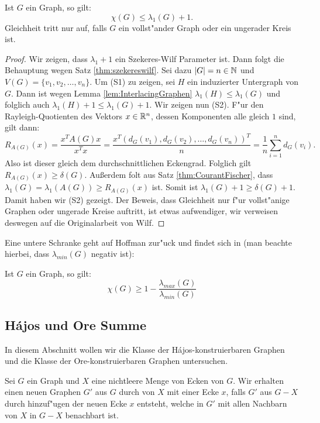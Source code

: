   \begin{theorem}
    Ist $G$ ein Graph, so gilt: 
    $$\chi(G) \leq \lambda_{1}(G) +1.$$
    Gleichheit tritt nur auf, falls $G$ ein vollst"ander Graph oder ein ungerader Kreis ist.
    \label{thm:wilfev}
  \end{theorem}

  \begin{proof}
    Wir zeigen, dass $\lambda_{1}+1$ ein Szekeres-Wilf Parameter ist. Dann folgt die Behauptung wegen Satz \ref{thm:szekereswilf}. Sei dazu $|G| = n \in {\mathbb{N}}$ und $V(G)= \{v_1,v_2, \dots , v_n \}$. 
    Um (S1) zu zeigen, sei $H$ ein induzierter Untergraph von $G$. Dann ist wegen Lemma \ref{lem:InterlacingGraphen} $\lambda_{1}(H) \leq \lambda_{1}(G)$ und folglich auch $\lambda_{1}(H) +1 \leq \lambda_{1}(G) +1$.
    Wir zeigen nun (S2). F"ur den Rayleigh-Quotienten des Vektors $x\in {\mathbb{R}}^{n}$, dessen Komponenten alle gleich $1$ sind, gilt dann:
    $$R_{A(G)}(x) = \frac{x^{T}A(G)x}{x^{T}x} = \frac{x^{T}(d_G(v_1),d_G(v_2),\dots, d_G(v_n))^{T}}{n} = \frac{1}{n} \sum\limits_{i=1}^{n} d_G(v_i).$$ 
    Also ist dieser gleich dem durchschnittlichen Eckengrad. Folglich gilt $R_{A(G)}(x) \geq \delta(G)$. Au{\ss}erdem folt aus Satz \ref{thm:CourantFischer}, dass $\lambda_{1}(G) = \lambda_{1}(A(G)) \geq R_{A(G)}(x)$ ist. Somit ist
    $\lambda_{1}(G) +1 \geq \delta(G) +1$. Damit haben wir (S2) gezeigt. 
    Der Beweis, dass Gleichheit nur f"ur vollst"anige Graphen oder ungerade Kreise auftritt, ist etwas aufwendiger, wir verweisen deswegen auf die Originalarbeit \cite{Wilf67} von Wilf.
  \end{proof}

  Eine untere Schranke geht auf Hoffman zur"uck und findet sich in \cite{Hoffman70}(man beachte hierbei, dass $\lambda_{min}(G)$ negativ ist):
  \begin{theorem}
    Ist $G$ ein Graph, so gilt:
    $$\chi(G) \geq 1 - \frac{\lambda_{max}(G)}{\lambda_{min}(G)}$$
    \label{thm:Hoffmanev}
  \end{theorem}

  \subsection{H\'ajos und Ore Summe}
  In diesem Abschnitt wollen wir die Klasse der H\'ajos-konstruierbaren Graphen und die Klasse der Ore-konstruierbaren Graphen untersuchen. 

  Sei $G$ ein Graph und $X$ eine nichtleere Menge von Ecken von $G$. Wir erhalten einen neuen Graphen $G'$ aus $G$ durch   von $X$ mit einer Ecke $x$, falls $G'$ aus $G-X$ durch hinzuf"ugen der neuen Ecke $x$ entsteht, welche in $G'$ mit allen Nachbarn von $X$ in $G-X$ benachbart ist. 

